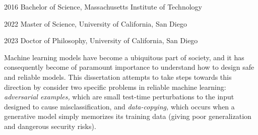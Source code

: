 \documentclass[12pt]{ucsddissertation}
\begin{document}
\begin{vita}
\noindent
\begin{cv}{}
\begin{cvlist}{}
\item[2016] Bachelor of Science, Massachusetts Institute of Technology
\item[2022] Master of Science, University of California, San Diego
\item[2023] Doctor of Philosophy, University of California, San Diego
\end{cvlist}
\end{cv}


\end{vita}

\begin{dissertationabstract}
Machine learning models have become a ubiquitous part of society, and it has consequently become of paramount importance to understand how to design safe and reliable models. This dissertation attempts to take steps towards this direction by consider two specific problems in reliable machine learning: \textit{adversarial examples,} which are small test-time perturbations to the input designed to cause misclassification, and \textit{data-copying,} which occurs when a generative model simply memorizes its training data (giving poor generalization and dangerous security risks). 
\end{dissertationabstract}
\end{document}
